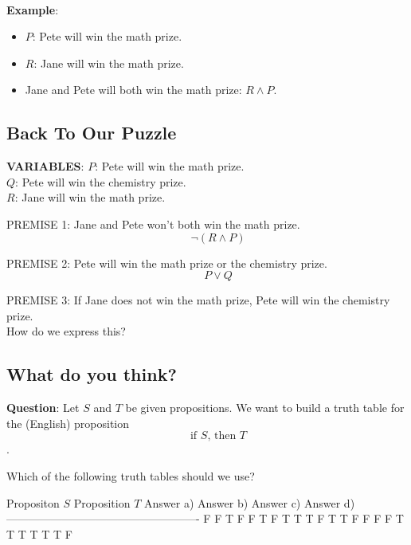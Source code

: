\documentclass[11pt]{article}
\begin{document}
    
    
    \begin{center}
    \end{center}
    { \hspace*{\fill} \\}
    
    \textbf{Example}:

\begin{itemize}
\item
  \(P\): Pete will win the math prize.
\item
  \(R\): Jane will win the math prize.
\item
  Jane and Pete will both win the math prize: \(R \land P\).
\end{itemize}

    \subsection{Back To Our Puzzle}\label{back-to-our-puzzle}

    \textbf{VARIABLES}: \(P\): Pete will win the math prize.\\
\(Q\): Pete will win the chemistry prize.\\
\(R\): Jane will win the math prize.

PREMISE 1: Jane and Pete won't both win the math prize.
\[\qquad \neg ( R \land P)\]

PREMISE 2: Pete will win the math prize or the chemistry prize.
\[\qquad P \lor Q\]

PREMISE 3: If Jane does not win the math prize, Pete will win the
chemistry prize.\\
{How do we express this?}

    \subsection{What do you think?}\label{what-do-you-think}

\textbf{Question}: Let \(S\) and \(T\) be given propositions. We want to
build a truth table for the (English) proposition
\[\qquad \mbox{if } S \mbox{, then } T\].

Which of the following truth tables should we use?

\textbar{} Propositon \(S\) \textbar{} Proposition \(T\)
\textbar{}\textbar{} Answer a) \textbar{} Answer b) \textbar{} Answer c)
\textbar{} Answer d) \textbar{}
\textbar{}---\textbar{}---\textbar{}\textbar{}------------\textbar{}---------\textbar{}---------\textbar{}----------------\textbar{}
\textbar{} F \textbar{} F \textbar{}\textbar{} T \textbar{} F \textbar{}
F \textbar{} T \textbar{} \textbar{} F \textbar{} T \textbar{}\textbar{}
T \textbar{} T \textbar{} F \textbar{} T \textbar{} \textbar{} T
\textbar{} F \textbar{}\textbar{} F \textbar{} F \textbar{} F \textbar{}
T \textbar{} \textbar{} T \textbar{} T \textbar{}\textbar{} T \textbar{}
T \textbar{} T \textbar{} F \textbar{}
\end{document}
